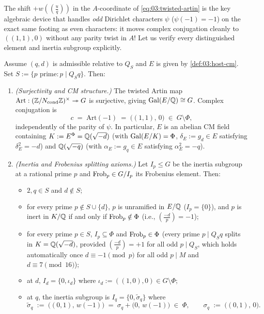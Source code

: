 The shift $+ w((\frac{u}{q}))$ in the $A$-coordinate of \eqref{eq:03:twisted-artin} is the key algebraic device that handles \emph{odd} Dirichlet characters $\psi$ ($\psi(-1) = -1$) on the exact same footing as even characters: it moves complex conjugation cleanly to $((1, 1), 0)$ without any parity twist in $A$! Let us verify every distinguished element and inertia subgroup explicitly.

\begin{proposition}
\label{prop:03:host-axioms}
Assume $(q, d)$ is admissible relative to $Q_S$ and $E$ is given by \cref{def:03:host-cm}. Set $S := \{p \text{ prime} : p \mid Q_S q\}$. Then:
\begin{enumerate}[label=\textup{(\roman*)}]
\item \emph{(Surjectivity and CM structure.)} The twisted Artin map $\mathrm{Art} : (\mathbb{Z}/N_{\mathrm{cond}}\mathbb{Z})^\times \twoheadrightarrow G$ is surjective, giving $\mathrm{Gal}(E/\mathbb{Q}) \cong G$. Complex conjugation is
  \[
    c \;=\; \mathrm{Art}(-1) \;=\; \bigl((1, 1),\, 0\bigr) \;\in\; G \setminus \Phi,
  \]
  independently of the parity of $\psi$. In particular, $E$ is an abelian CM field containing $K := E^{\Phi} = \mathbb{Q}(\sqrt{-d})$ (with $\mathrm{Gal}(E/K) = \Phi$, $\delta_E := g_d \in E$ satisfying $\delta_E^2 = -d$) and $\mathbb{Q}(\sqrt{-q})$ (with $\alpha_E := g_q \in E$ satisfying $\alpha_E^2 = -q$).

\item \emph{(Inertia and Frobenius splitting axioms.)} Let $I_p \le G$ be the inertia subgroup at a rational prime $p$ and $\mathrm{Frob}_p \in G / I_p$ its Frobenius element. Then:
  \begin{itemize}
  \item $2, q \in S$ and $d \notin S$;
  \item for every prime $p \notin S \cup \{d\}$, $p$ is unramified in $E/\mathbb{Q}$ ($I_p = \{0\}$), and $p$ is inert in $K/\mathbb{Q}$ if and only if $\mathrm{Frob}_p \notin \Phi$ (i.e., $(\frac{-d}{p}) = -1$);
  \item for every prime $p \in S$, $I_p \subseteq \Phi$ and $\mathrm{Frob}_p \in \Phi$ (every prime $p \mid Q_S q$ splits in $K = \mathbb{Q}(\sqrt{-d})$, provided $(\frac{-d}{p}) = +1$ for all odd $p \mid Q_S$, which holds automatically once $d \equiv -1 \pmod{p}$ for all odd $p \mid M$ and $d \equiv 7 \pmod{16}$);
  \item at $d$, $I_d = \{0, \iota_d\}$ where $\iota_d := ((1, 0), 0) \in G \setminus \Phi$;
  \item at $q$, the inertia subgroup is $I_q = \{0, \widetilde{\sigma}_q\}$ where
    \begin{equation}
    \label{eq:03:true-inertia-q}
      \widetilde{\sigma}_q \;:=\; \bigl((0, 1),\, w(-1)\bigr) \;=\; \sigma_q + \bigl(0,\, w(-1)\bigr) \;\in\; \Phi,
      \qquad \sigma_q \;:=\; \bigl((0, 1),\, 0\bigr).
    \end{equation}
  \end{itemize}


\end{enumerate}
\end{proposition}
